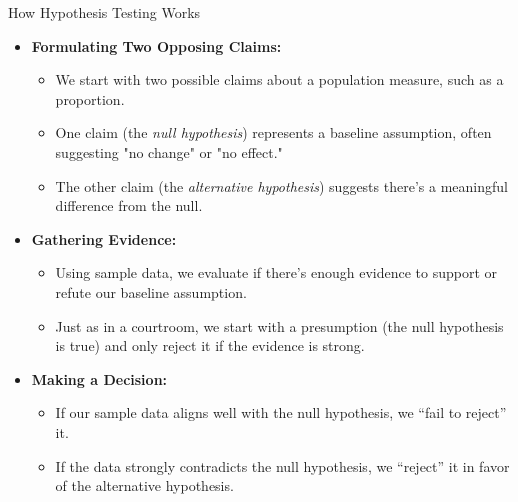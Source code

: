 \documentclass[handout]{beamer} %
\begin{document}
\begin{frame}{How Hypothesis Testing Works}
    \begin{itemize}
        \item \textbf{Formulating Two Opposing Claims:}
        \begin{itemize}
            \item We start with two possible claims about a population measure, such as a proportion.
            \item One claim (the \textit{null hypothesis}) represents a baseline assumption, often suggesting "no change" or "no effect."
            \item The other claim (the \textit{alternative hypothesis}) suggests there’s a meaningful difference from the null.
        \end{itemize}

        \item \textbf{Gathering Evidence:}
        \begin{itemize}
            \item Using sample data, we evaluate if there’s enough evidence to support or refute our baseline assumption.
            \item Just as in a courtroom, we start with a presumption (the null hypothesis is true) and only reject it if the evidence is strong.
        \end{itemize}

        \item \textbf{Making a Decision:}
        \begin{itemize}
            \item If our sample data aligns well with the null hypothesis, we “fail to reject” it.
            \item If the data strongly contradicts the null hypothesis, we “reject” it in favor of the alternative hypothesis.
        \end{itemize}
    \end{itemize}
\end{frame}
\end{document}
